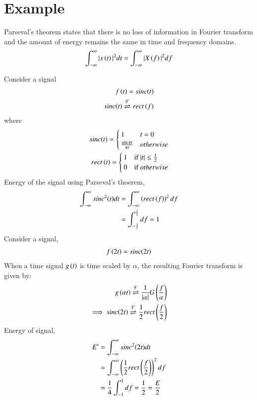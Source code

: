 \documentclass[journal,12pt,twocolumn]{IEEEtran}
\begin{document}
\section*{Example}
\begin{lemma}
Parseval's theorem states that there is no loss of information in Fourier transform and the amount of energy remains the same in time and frequency domains.
\begin{align}
    \int_{-\infty}^{\infty} |x\left(t\right)|^{2} dt = \int_{-\infty}^{\infty} |X\left(f\right)|^{2} df
\end{align}
\end{lemma}
Consider a signal 
\begin{align}
    f\left(t\right) = sinc{\left(t\right)}\\
    sinc{\left(t\right)} \overset{\mathcal{F}}{ \rightleftharpoons} rect\left(f\right)
\end{align}
where 
\begin{align}
sinc{\left(t\right)} =
    \begin{cases}
    1 & t = 0\\
    \frac{\sin{\pi t}}{\pi t} & otherwise
    \end{cases}\\
    rect\left(t\right) =
    \begin{cases}
    1 & \text{if } |t| \leq \frac{1}{2}\\
    0 & \text{if } otherwise
    \end{cases}
\end{align}
Energy of the signal using Parseval's thoerem,
\begin{align}
     \int_{-\infty}^{\infty} sinc^2{\left(t\right)}  dt &= \int_{-\infty}^{\infty} \left(rect\left(f\right)\right)^2  df \\
     &= \int_{-\frac{1}{2}}^{\frac{1}{2}} df = 1
\end{align}
Consider a signal,
\begin{align}
    f\left(2t\right) = sinc{\left(2t\right)}
\end{align}
When a time signal $g\left(t\right)$ is time scaled by $\alpha$, the resulting Fourier transform is given by:
\begin{align}
    \label{scale} g\left(\alpha t\right) \overset{\mathcal{F}}{ \rightleftharpoons} \frac{1}{\vert\alpha\vert}G\left(\frac{f}{\alpha}\right)\\
    \implies sinc{\left(2t\right)} \overset{\mathcal{F}}{ \rightleftharpoons}\frac{1}{2}rect\left(\frac{f}{2}\right)
\end{align}
Energy of signal,
\begin{align}
    E' &= \int_{-\infty}^{\infty} sinc^2{\left(2t\right)}  dt \\
    &= \int_{-\infty}^{\infty} \left(\frac{1}{2}rect\left(\frac{f}{2}\right)\right)^2 df \\
    &= \frac{1}{4}\int_{-1}^{1} df = \frac{1}{2} = \frac{E}{2}
\end{align}
\end{document}
